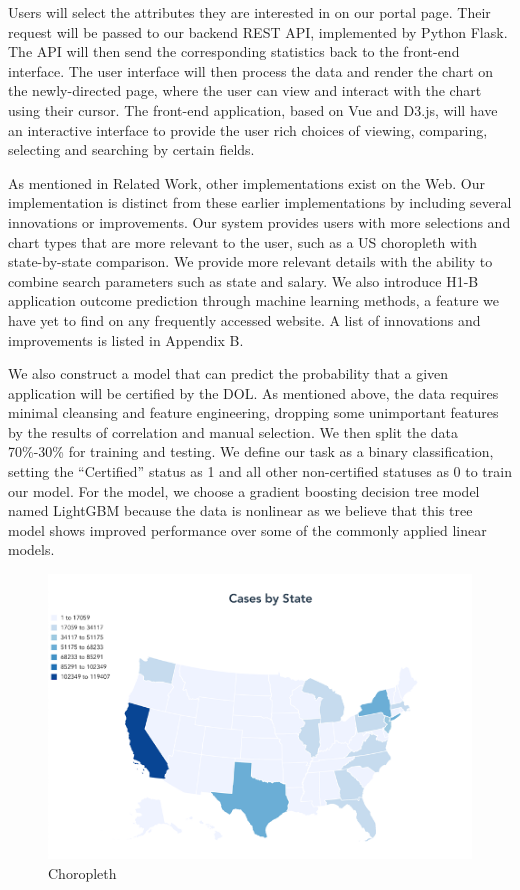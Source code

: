 \documentclass[sigconf]{acmart}
\begin{document}
Users will select the attributes they are interested in on our portal page. Their request will be passed to our 
backend REST API, implemented by Python Flask. The API will then send the corresponding statistics back to the 
front-end interface. The user interface will then process the data and render the chart on the newly-directed page, 
where the user can view and interact with the chart using their cursor. The front-end application, based on Vue and D3.js, 
will have an interactive interface to provide the user rich choices of viewing, comparing, selecting and searching by certain fields. 



As mentioned in Related Work, other implementations exist on the Web. Our implementation is distinct from these earlier 
implementations by including several innovations or improvements. Our system provides users with more selections and 
chart types that are more relevant to the user, such as a US choropleth with state-by-state comparison. 
We provide more relevant details with the ability to combine search parameters such as state and salary. 
We also introduce H1-B application outcome prediction through machine learning methods, a feature we have yet to find on 
any frequently accessed website. A list of innovations and improvements is listed in Appendix B.  


We also construct a model that can predict the probability that a given application will be certified by the DOL. 
As mentioned above, the data requires minimal cleansing and feature engineering, dropping some unimportant features 
by the results of correlation and manual selection. We then split the data 70\%-30\% for training and testing. 
We define our task as a binary classification, setting the “Certified” status as 1 and all other non-certified statuses 
as 0 to train our model. For the model, we choose a gradient boosting decision tree model named LightGBM because the data 
is nonlinear as we believe that this tree model shows improved performance over some of the commonly applied linear models. 
\begin{figure}
  \includegraphics[width=\linewidth]{fig1.png}
  \caption{Choropleth}
  \label{fig:choropleth}
\end{figure}
\end{document}
